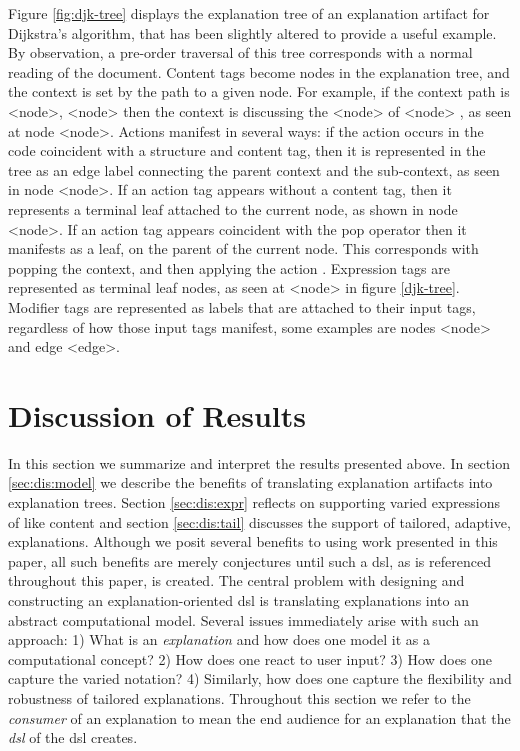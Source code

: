 \documentclass[sigconf]{acmart}
\begin{document}


Figure \ref{fig:djk-tree} displays the explanation tree of an explanation
artifact for Dijkstra's algorithm, that has been slightly altered to provide a
useful example. By observation, a pre-order traversal of this
tree corresponds with a normal reading of the document. Content tags become
nodes in the explanation tree, and the context is set by the path to a given
node. For example, if the context path is <node>, <node> then the context is
discussing the <node> of <node> , as seen at node <node>. Actions manifest in several ways: if the
action occurs in the code coincident with a structure and content tag, then it
is represented in the tree as an edge label connecting the parent context and
the sub-context, as seen in node <node>. If an action tag appears without a
content tag, then it represents a terminal leaf attached to the current node, as
shown in node <node>. If an action tag appears coincident with the pop operator
then it manifests as a leaf, on the parent of the current node. This corresponds
with popping the context, and then applying the action . Expression tags are
represented as terminal leaf nodes, as seen at <node> in figure \ref{djk-tree}.
Modifier tags are represented as labels that are attached to their input tags,
regardless of how those input tags manifest, some examples are nodes <node> and
edge <edge>.

\section{Discussion of Results}
In this section we summarize and interpret the results presented above. In
section \ref{sec:dis:model} we describe the benefits of translating
explanation artifacts into explanation trees. Section \ref{sec:dis:expr} reflects
on supporting varied expressions of like content and section \ref{sec:dis:tail}
discusses the support of tailored, adaptive, explanations. Although we posit
several benefits to using work presented in this paper, all such benefits are
merely conjectures until such a dsl, as is referenced throughout this paper, is
created. 
%
The central problem with designing and constructing an explanation-oriented dsl
is translating explanations into an abstract computational model. Several issues
immediately arise with such an approach: 1) What is an \emph{explanation} and
how does one model it as a computational concept? 2) How does one react to user
input? 3) How does one capture the varied notation? 4) Similarly, how does one
capture the flexibility and robustness of tailored explanations. Throughout this
section we refer to the \emph{consumer} of an explanation to mean the end audience
for an explanation that the \emph{dsl} of the dsl creates. 
\end{document}
